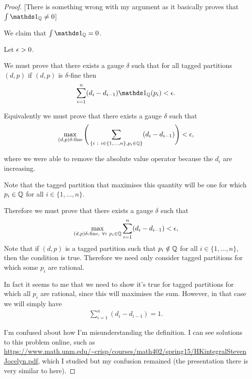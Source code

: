 \begin{proof}

  [There is something wrong with my argument as it basically proves that $\int \ind_\Q \neq 0$]

  We claim that $\int \ind_\Q = 0$.

  Let $\epsilon > 0$.

  We must prove that there exists a gauge $\delta$ such that for all tagged partitions $(d, p)$ if $(d, p)$
  is $\delta$-fine then
  \begin{align*}
    \sum_{i=1}^n (d_i - d_{i-1})\ind_\Q(p_i) < \eps.
  \end{align*}

  Equivalently we must prove that there exists a gauge $\delta$ such that
  \begin{align*}
    \max_{(d, p) \delta\text{-fine}} \Bigg( \sum_{\{i ~:~ i \in \{1, \ldots, n\}, p_i \in \mathbb{Q}\}} (d_i - d_{i-1}) \Bigg) < \epsilon,
  \end{align*}

  where we were able to remove the absolute value operator because the $d_i$ are increasing.

  Note that the tagged partition that maximises this quantity will be one for which $p_i \in \mathbb{Q}$ for
  all $i \in \{1, \ldots, n\}$.

  Therefore we must prove that there exists a gauge $\delta$ such that
  \begin{align*}
    \max_{(d, p) \delta\text{-fine}, ~\forall i ~ p_i \in \mathbb{Q}} \sum_{i=1}^n (d_i - d_{i-1}) < \epsilon,
  \end{align*}
  Note that if $(d, p)$ is a tagged partition such that $p_i \notin \mathbb{Q}$ for all $i \in \{1, \ldots, n\}$, then
  the condition is true. Therefore we need only consider tagged partitions for which some $p_i$ are rational.

  In fact it seems to me that we need to show it's true for tagged partitions for which all $p_i$ are rational,
  since this will maximises the sum. However, in that case we will simply have
  \begin{align*}
    \sum_{i=1}^n (d_i - d_{i-1}) = 1.
  \end{align*}

   I'm confused about how I'm misunderstanding the definition. I can see solutions to this problem online,
  such as \url{https://www.math.unm.edu/~crisp/courses/math402/spring15/HKintegralStevenJocelyn.pdf}, which I studied but my confusion remained (the
  presentation there is very similar to here).
\end{proof}










